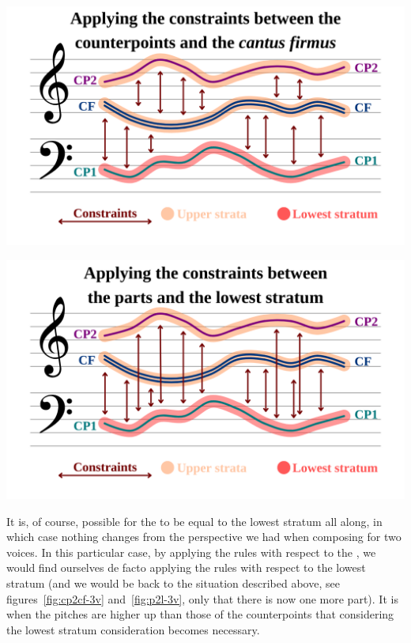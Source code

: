 \vspace{.5cm}
\begin{minipage}{0.46\textwidth}
    \centering
    \includegraphics[width=\textwidth]{Images/cp2cf-3v.png}
    \label{fig:cp2cf-3v}
    \end{minipage}
    \hfill
    \begin{minipage}{0.46\textwidth}
      \centering
      \includegraphics[width=\textwidth]{Images/p2l-3v.png}
      \label{fig:p2l-3v}
\end{minipage}
\vspace{.5cm}

It is, of course, possible for the \cfs to be equal to the lowest stratum all along, in which case nothing changes from the perspective we had when composing for two voices. In this particular case, by applying the rules with respect to the \cf, we would find ourselves de facto applying the rules with respect to the lowest stratum (and we would be back to the situation described above, see figures~\ref{fig:cp2cf-3v} and~\ref{fig:p2l-3v}, only that there is now one more part). It is when the \cfs pitches are higher up than those of the counterpoints that considering the lowest stratum consideration becomes necessary.

